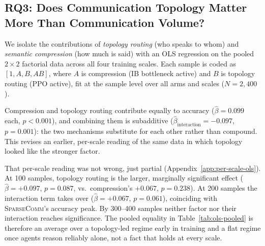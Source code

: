 \documentclass[11pt]{article}
\newcommand{\sys}{\textsc{SparseComm}\xspace}
\begin{document}
\subsection{RQ3: Does Communication Topology Matter More Than Communication Volume?}
\label{sec:rq3}

We isolate the contributions of \emph{topology routing} (who speaks to
whom) and \emph{semantic compression} (how much is said) with an OLS
regression on the pooled $2\times2$ factorial data across all four training
scales. Each sample is coded as $[1,A,B,AB]$, where $A$ is compression (IB
bottleneck active) and $B$ is topology routing (PPO active), fit at the
sample level over all arms and scales ($N=2{,}400$).

\begin{table}[t]
\centering
\small
{}
\caption{Pooled $2\times2$ factorial OLS coefficients (sample level, all
four training scales).}
\label{tab:ols-pooled}
\end{table}

Compression and topology routing contribute equally to accuracy
($\hat\beta = 0.099$ each, $p<0.001$), and combining them is subadditive
($\hat\beta_{\text{interaction}}=-0.097$, $p=0.001$): the two mechanisms
substitute for each other rather than compound. This revises an earlier,
per-scale reading of the same data in which topology looked like the
stronger factor.

That per-scale reading was not wrong, just partial
(Appendix~\ref{app:per-scale-ols}). At 100 samples, topology routing is the
larger, marginally significant effect ($\hat\beta=+0.097$, $p=0.087$, vs.\
compression's $+0.067$, $p=0.238$). At 200 samples the interaction term
takes over ($\hat\beta=+0.067$, $p=0.061$), coinciding with \sys's accuracy
peak. By 300--400 samples neither factor nor their interaction reaches
significance. The pooled equality in Table~\ref{tab:ols-pooled} is
therefore an average over a topology-led regime early in training and a
flat regime once agents reason reliably alone, not a fact that holds at
every scale.
\end{document}
